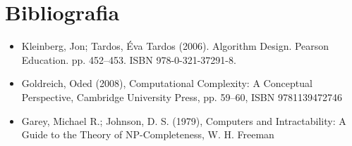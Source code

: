 \documentclass{article}
\begin{document}
\section{Bibliografia}
\begin{itemize}
    \item Kleinberg, Jon; Tardos, Éva Tardos (2006). Algorithm Design. Pearson Education. pp. 452–453. ISBN 978-0-321-37291-8.
    \item Goldreich, Oded (2008), Computational Complexity: A Conceptual Perspective, Cambridge University Press, pp. 59–60, ISBN 9781139472746
    \item  Garey, Michael R.; Johnson, D. S. (1979), Computers and Intractability: A Guide to the Theory of NP-Completeness, W. H. Freeman
\end{itemize} 
\end{document}
